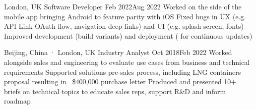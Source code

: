 

               {London, UK}
{Software Developer}                                {Feb 2022}{Aug 2022}
{Worked on the  side of the  mobile app bringing Android to feature parity with iOS}
{Fixed bugs in UX (e.g.  API Link OAuth flow, navigation deep links) and UI (e.g. splash screen, fonts)}
{Improved development (build variants) and deployment ( for continuous updates)}


       {Beijing, China · London, UK}
{Industry Analyst}                                  {Oct 2018}{Feb 2022}
{Worked alongside sales and engineering to evaluate use cases from business and technical requirements}
{Supported solutions pre-sales process, including LNG containers proposal resulting in ~\$400,000 purchase letter}
{Produced and presented 10+ briefs on technical topics to educate sales reps, support R\&D and inform roadmap}





